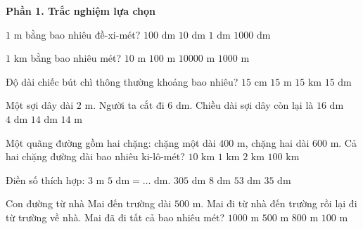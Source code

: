 \textbf{Phần 1. Trắc nghiệm lựa chọn}

\begin{ex} %
$1\text{ m}$ bằng bao nhiêu đề-xi-mét?
\choice
{$100\text{ dm}$}
{\True $10\text{ dm}$}
{$1\text{ dm}$}
{$1 000\text{ dm}$}
\end{ex}

\begin{ex} %
$1\text{ km}$ bằng bao nhiêu mét?
\choice
{$10\text{ m}$}
{$100\text{ m}$}
{$10 000\text{ m}$}
{\True $1 000\text{ m}$}
\end{ex}

\begin{ex} %
Độ dài chiếc bút chì thông thường khoảng bao nhiêu?
\choice
{\True $15\text{ cm}$}
{$15\text{ m}$}
{$15\text{ km}$}
{$15\text{ dm}$}
\end{ex}

\begin{ex} %
Một sợi dây dài $2\text{ m}$. Người ta cắt đi $6\text{ dm}$. Chiều dài sợi dây còn lại là
\choice
{$16\text{ dm}$}
{$4\text{ dm}$}
{\True $14\text{ dm}$}
{$14\text{ m}$}
\end{ex}

\begin{ex} %
Một quãng đường gồm hai chặng: chặng một dài $400\text{ m}$, chặng hai dài $600\text{ m}$. Cả hai chặng đường dài bao nhiêu ki-lô-mét?
\choice
{$10\text{ km}$}
{\True $1\text{ km}$}
{$2\text{ km}$}
{$100\text{ km}$}
\end{ex}

\begin{ex} %
Điền số thích hợp: $3\text{ m } 5\text{ dm} = \dots\text{ dm}$.
\choice
{$305\text{ dm}$}
{$8\text{ dm}$}
{$53\text{ dm}$}
{\True $35\text{ dm}$}
\end{ex}

\begin{ex} %
Con đường từ nhà Mai đến trường dài $500\text{ m}$. Mai đi từ nhà đến trường rồi lại đi từ trường về nhà. Mai đã đi tất cả bao nhiêu mét?
\choice
{\True $1 000\text{ m}$}
{$500\text{ m}$}
{$800\text{ m}$}
{$100\text{ m}$}
\end{ex}

